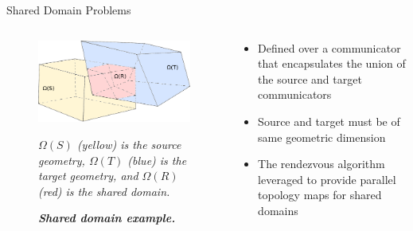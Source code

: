\documentclass{beamer}
\begin{document}
\begin{frame}{Shared Domain Problems}

  \begin{columns}
    
    \begin{column}{0.5\textwidth}
      \begin{figure}[htpb!]
        \centering \includegraphics[width=2.5in]{overlapping_domain.pdf}
        \caption{\bf \sl Shared domain example.} {\sl $\Omega(S)$ (yellow)
          is the source geometry, $\Omega(T)$ (blue) is the target geometry,
          and $\Omega(R)$ (red) is the shared domain.}
        \label{fig:shared_domain}
      \end{figure}
    \end{column}

    \begin{column}{0.5\textwidth}
      \begin{itemize}
      \item Defined over a communicator that encapsulates the union of
        the source and target communicators
        \bigskip
      \item Source and target must be of same geometric dimension
        \bigskip
      \item The rendezvous algorithm leveraged to provide parallel
        topology maps for shared domains
      \end{itemize}
    \end{column}

  \end{columns}

\end{frame}
\end{document}
